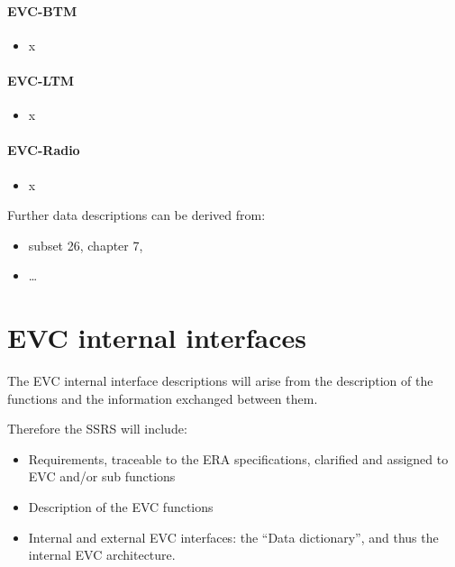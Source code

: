 \documentclass{template/openetcs_article}
\begin{document}
\paragraph{EVC-BTM}
\begin{itemize}
\item x
\end{itemize}

\paragraph{EVC-LTM}
\begin{itemize}
\item x
\end{itemize}

\paragraph{EVC-Radio}
\begin{itemize}
\item x
\end{itemize}



Further data descriptions can be derived from:

\begin{itemize}
\item subset 26, chapter 7,
\item {\dots}
\end{itemize}

\section[EVC internal interfaces]{EVC internal interfaces}

\bigskip

The EVC internal interface descriptions will arise from the description of the functions and the information exchanged between them.



Therefore the SSRS will include:

\begin{itemize}
\item Requirements, traceable to the ERA specifications, clarified and assigned to EVC and/or sub functions
\item Description of the EVC functions
\item Internal and external EVC interfaces: the {\textquotedblleft}Data dictionary{\textquotedblright}, and thus the internal EVC architecture.
\end{itemize}
\end{document}
